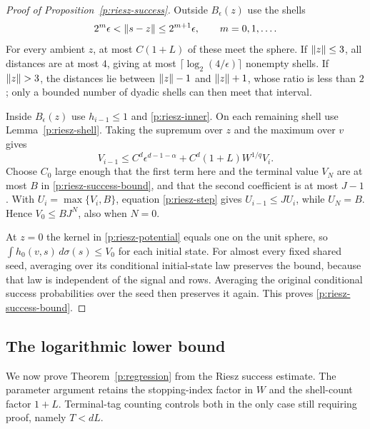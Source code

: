 \begin{proof}[Proof of Proposition~\ref{p:riesz-success}]
Outside $B_\epsilon(z)$ use the shells
\[
 2^m\epsilon<\left\lVert s-z\right\rVert\le2^{m+1}\epsilon,
 \qquad m=0,1,\ldots .
\]
For every ambient $z$, at most $C(1+L)$ of these meet the
sphere.  If $\left\lVert z\right\rVert\le3$, all distances are at most $4$, giving
at most $\lceil\log_2(4/\epsilon)\rceil$ nonempty shells.  If
$\left\lVert z\right\rVert>3$, the distances lie between $\left\lVert z\right\rVert-1$ and
$\left\lVert z\right\rVert+1$, whose ratio is less than $2$; only a bounded number
of dyadic shells can then meet that interval.

Inside $B_\epsilon(z)$ use $h_{i-1}\le1$ and
\eqref{p:riesz-inner}.  On each remaining shell use
Lemma~\ref{p:riesz-shell}.  Taking the supremum over $z$ and the
maximum over $v$ gives
\begin{equation}\label{p:riesz-step}
 V_{i-1}\le C^d\epsilon^{d-1-\alpha}
          +C^d(1+L)W^{1/q}V_i .
\end{equation}
Choose $C_0$ large enough that the first term here and the
terminal value $V_N$ are at most $B$ in
\eqref{p:riesz-success-bound}, and that the second coefficient is
at most $J-1$.  With $U_i=\max\{V_i,B\}$, equation
\eqref{p:riesz-step} gives $U_{i-1}\le J U_i$, while $U_N=B$.
Hence $V_0\le BJ^N$, also when $N=0$.

At $z=0$ the kernel in \eqref{p:riesz-potential} equals one on
the unit sphere, so $\int h_0(v,s)\,d\sigma(s)\le V_0$ for
each initial state. For almost every fixed shared seed, averaging over its
conditional initial-state law preserves the bound, because that law is
independent of the signal and rows. Averaging the original conditional
success probabilities over the seed then
preserves it again.  This proves \eqref{p:riesz-success-bound}.
\end{proof}

\subsection{The logarithmic lower bound}

We now prove Theorem~\ref{p:regression} from the Riesz success estimate.
The parameter argument retains the stopping-index factor in $W$ and
the shell-count factor $1+L$. Terminal-tag counting controls both in
the only case still requiring proof, namely $T<dL$.

